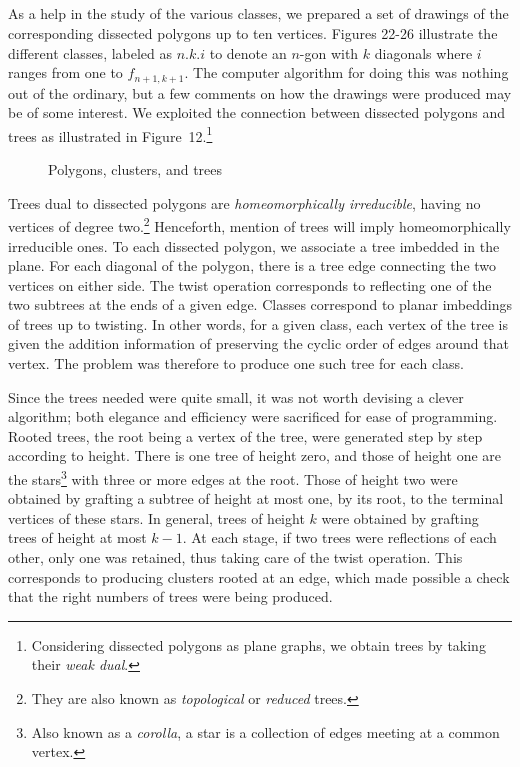 \documentclass[10pt]{amsart}
\begin{document}
    \subsection{}
    As a help in the study of the various classes, we prepared a set of drawings of the corresponding dissected polygons up to ten vertices. Figures 22-26 illustrate the different classes, labeled as $n.k.i$ to denote an $n$-gon with $k$ diagonals where $i$ ranges from one to $f_{n+1,k+1}$. The computer algorithm for doing this was nothing out of the ordinary, but a few comments on how the drawings were produced may be of some interest. We exploited the connection between dissected polygons and trees as illustrated in Figure~12.\footnote{Considering dissected polygons as plane graphs, we obtain trees by taking their {\em weak dual}.}
    \begin{figure}[h]
    \caption{Polygons, clusters, and trees}
    \label{f:pct}
    \end{figure}
    Trees dual to dissected polygons are {\em homeomorphically irreducible}, having no vertices of degree two.\footnote{They are also known as {\em topological} or {\em reduced} trees.} Henceforth, mention of trees will imply homeomorphically irreducible ones. To each dissected polygon, we associate a tree imbedded in the plane. For each diagonal of the polygon, there is a tree edge connecting the two vertices on either side. The twist operation corresponds to reflecting one of the two subtrees at the ends of a given edge. Classes correspond to planar imbeddings of trees up to twisting.  In other words, for a given class, each vertex of the tree is given the addition information of preserving the cyclic order of edges around that vertex. The problem was therefore to produce one such tree for each class.
    
    Since the trees needed were quite small, it was not worth devising a clever algorithm; both elegance and efficiency were sacrificed for ease of programming.  Rooted trees, the root being a vertex of the tree, were generated step by step according to height.   There is one tree of height zero, and those of height one are the stars\footnote{Also known as a {\em corolla}, a star is a collection of edges meeting at a common vertex.} with three or more edges at the root.  Those of height two were obtained by grafting a subtree of height at most one, by its root, to the terminal vertices of these stars.  In general, trees of height $k$ were obtained by grafting trees of height at most $k - 1$. At each stage, if two trees were reflections of each other, only one was retained, thus taking care of the twist operation.  This corresponds to producing clusters rooted at an edge, which made possible a check that the right numbers of trees were being produced.
    
\end{document}
